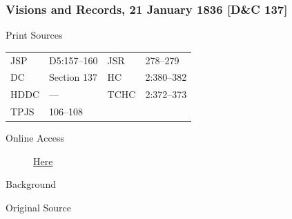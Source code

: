 		\subsubsection{Visions and Records, 21 January 1836 [D\&C 137]}
			\label{EMS-1836-JS-21-JAN-1836}
			
			\begin{description}
					\item[Print Sources]
				\end{description}

					\begin{tabular}{p{0.5in}p{1in}p{0.5in}p{1in}}
					JSP	 	& D5:157--160		& JSR 		& 278--279 \\
					DC	 	& Section 137		& HC 		& 2:380--382 \\
					HDDC 	& ---				& TCHC 		& 2:372--373 \\
					TPJS 	& 106--108			& 	 		&  \\
					\end{tabular}
				
				\begin{description}
					\item[Online Access] \href{https://www.josephsmithpapers.org/paper-summary/visions-21-january-1836-dc-137/1}{Here}
				\end{description}
				
				\begin{description}
					\item[Background]
				\end{description}
				
				
				\begin{description}
					\item[Original Source]
				\end{description}
				
				
